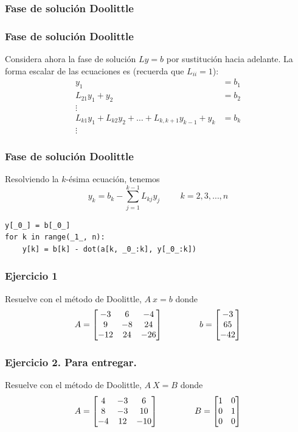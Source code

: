 \subsubsection{Fase de solución Doolittle}
\begin{frame}
\frametitle{Fase de solución Doolittle}
Considera ahora la fase de solución $Ly=b$ por sustitución hacia adelante. La forma escalar de las ecuaciones es (recuerda que $L_{ii}=1$):
\begin{align*}
		y_{1} &= b_{1} \\
		L_{21}y_{1}+y_{2} &=  b_{2} \\
		\vdots \\
		L_{k1}y_{1} + L_{k2}y_{2} + \ldots + L_{k,k+1} y_{k-1} + y_{k} &= b_{k} \\
		\vdots
\end{align*}
\end{frame}
\begin{frame}[fragile]
\frametitle{Fase de solución Doolittle}
Resolviendo la $k$-ésima ecuación, tenemos
\[ y_{k} = b_{k} - \sum_{j=1}^{k - 1} L_{kj}y_{j} \hspace{1cm} k=2,3,\ldots,n\]
\begin{lstlisting}[caption=Fase de solución, style=FormattedNumber, basicstyle=\linespread{1.1}\ttfamily=\small, columns=fullflexible]
y[_0_] = b[_0_]
for k in range(_1_, n):
    y[k] = b[k] - dot(a[k, _0_:k], y[_0_:k])
\end{lstlisting}
\end{frame}
\begin{frame}
\frametitle{Ejercicio 1}
Resuelve con el método de Doolittle, $A \: x = b$ donde
\[ A =
	\begin{bmatrix}
		-3 & 6 & -4 \\
		9 & -8 & 24 \\
		-12 & 24 & -26 
	\end{bmatrix}
	\hspace{1.5cm} b =
	\begin{bmatrix}
		-3 \\
		65 \\
		-42
	\end{bmatrix} \]
\end{frame}
\begin{frame}
\frametitle{Ejercicio 2. Para entregar.}
Resuelve con el método de Doolittle, $A \: X = B$ donde
\[ A = 
	\begin{bmatrix}
		4 & -3 & 6 \\
		8 & -3 & 10 \\
		-4 & 12 & -10 
	\end{bmatrix}
	\hspace{1.5cm} B =
	\begin{bmatrix}
		1 & 0 \\
		0 & 1 \\
		0 & 0
	\end{bmatrix} \]
\end{frame}
